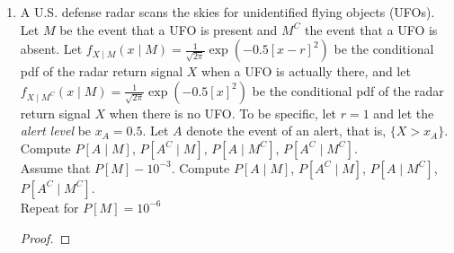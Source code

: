 \documentclass[paper=usletter, fontsize=12pt]{article}
\begin{document}
\begin{enumerate}
        \item A U.S. defense radar scans the skies for unidentified flying
        objects (UFOs). Let $M$ be the event that a UFO is present and $M^C$
        the event that a UFO is absent. Let $f_{X \mid M}(x \mid
        M)=\frac{1}{\sqrt{2\pi}}\exp(-0.5[x-r]^2)$ be the conditional pdf of
        the radar return signal $X$ when a UFO is actually there, and let $f_{X
        \mid M^C}(x \mid M)=\frac{1}{\sqrt{2\pi}}\exp(-0.5[x]^2)$ be the
        conditional pdf of the radar return signal $X$ when there is no UFO. To
        be specific, let $r=1$ and let the \textit{alert level} be $x_A=0.5$.
        Let $A$ denote the event of an alert, that is, $\{X>x_A\}$. Compute
        $P[A\mid M]$, $P[A^C\mid M]$, $P[A\mid M^C]$, $P[A^C\mid M^C]$.\\
        Assume that $P[M]-10^{-3}$. Compute $P[A\mid M]$, $P[A^C\mid M]$,
        $P[A\mid M^C]$, $P[A^C\mid M^C]$.\\
        Repeat for $P[M]=10^{-6}$
        \begin{proof}
        \end{proof}

    \end{enumerate}
\end{document}
